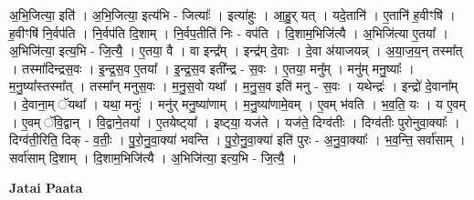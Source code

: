 \documentclass[17pt]{extarticle}
\begin{document}
अ॒भि॒जित्या॒ इति॑ । अ॒भि॒जित्या॒ इत्य॑भि - जित्याः᳚ । इत्या॑हुः । आ॒हु॒र् यत् । यदे॒तानि॑ । ए॒तानि॑ ह॒वीꣳषि॑ । ह॒वीꣳषि॑ नि॒र्वप॑ति । नि॒र्वप॑ति दि॒शाम् । नि॒र्वप॒तीति॑ निः - वप॑ति । दि॒शाम॒भिजि॑त्यै । अ॒भिजि॑त्या ए॒तया᳚ । अ॒भिजि॑त्या॒ इत्य॒भि - जि॒त्यै॒ । ए॒तया॒ वै । वा इन्द्र᳚म् । इन्द्र॑म् दे॒वाः । दे॒वा अ॑याजयन्न् । अ॒या॒ज॒य॒न् तस्मा᳚त् । तस्मा॑दिन्द्रस॒वः । इ॒न्द्र॒स॒व ए॒तया᳚ । इ॒न्द्र॒स॒व इती᳚न्द्र - स॒वः । ए॒तया॒ मनु᳚म् । मनु॑म् मनु॒ष्याः᳚ । म॒नु॒ष्या᳚स्तस्मा᳚त् । तस्मा᳚न् मनुस॒वः । म॒नु॒स॒वो यथा᳚ । म॒नु॒स॒व इति॑ मनु - स॒वः । यथेन्द्रः॑ । इन्द्रो॑ दे॒वाना᳚म् । दे॒वाना॒म् ॅयथा᳚ । यथा॒ मनुः॑ । मनु॑र् मनु॒ष्या॑णाम् । म॒नु॒ष्या॑णामे॒वम् । ए॒वम् भ॑वति । भ॒व॒ति॒ यः । य ए॒वम् । ए॒वम् ॅवि॒द्वान् । वि॒द्वाने॒तया᳚ । ए॒तयेष्ट्‍या᳚ । इष्ट्‍या॒ यज॑ते । यज॑ते॒ दिग्व॑तीः । दिग्व॑तीः पुरोनुवा॒क्याः᳚ । दिग्व॑ती॒रिति॒ दिक् - व॒तीः॒ । पु॒रो॒नु॒वा॒क्या॑ भवन्ति । पु॒रो॒नु॒वा॒क्या॑ इति॑ पुरः - अ॒नु॒वा॒क्याः᳚ । भ॒व॒न्ति॒ सर्वा॑साम् । सर्वा॑साम् दि॒शाम् । दि॒शाम॒भिजि॑त्यै । अ॒भिजि॑त्या॒ इत्य॒भि - जि॒त्यै॒ । \newline

\textbf{Jatai Paata} \newline
\end{document}
